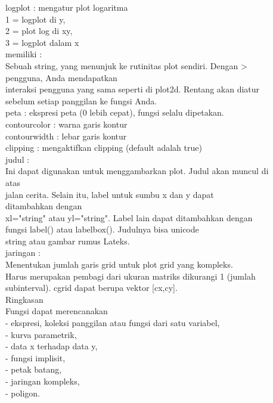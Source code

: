 \documentclass[a4paper,10pt]{article}
\begin{document}
\begin{eulernotebook}
\begin{eulercomment}
\begin{eulercomment}
\begin{eulercomment}
\begin{eulercomment}
\begin{eulercomment}
\begin{eulercomment}
\begin{eulercomment}
\begin{eulercomment}
\begin{eulercomment}
\begin{eulercomment}
\begin{eulercomment}
logplot : mengatur plot logaritma\\
1 = logplot di y,\\
2 = plot log di xy,\\
3 = logplot dalam x\\
memiliki :\\
Sebuah string, yang menunjuk ke rutinitas plot sendiri. Dengan \textgreater{}\\
pengguna, Anda mendapatkan\\
interaksi pengguna yang sama seperti di plot2d. Rentang akan diatur\\
sebelum setiap panggilan ke fungsi Anda.\\
peta : ekspresi peta (0 lebih cepat), fungsi selalu dipetakan.\\
contourcolor : warna garis kontur\\
contourwidth : lebar garis kontur\\
clipping : mengaktifkan clipping (default adalah true)\\
judul :\\
Ini dapat digunakan untuk menggambarkan plot. Judul akan muncul di\\
atas\\
jalan cerita. Selain itu, label untuk sumbu x dan y dapat\\
ditambahkan dengan\\
xl="string" atau yl="string". Label lain dapat ditambahkan dengan\\
fungsi label() atau labelbox(). Judulnya bisa unicode\\
string atau gambar rumus Lateks.\\
jaringan :\\
Menentukan jumlah garis grid untuk plot grid yang kompleks.\\
Harus merupakan pembagi dari ukuran matriks dikurangi 1 (jumlah\\
subinterval). cgrid dapat berupa vektor [cx,cy].\\
Ringkasan\\
Fungsi dapat merencanakan\\
- ekspresi, koleksi panggilan atau fungsi dari satu variabel,\\
- kurva parametrik,\\
- data x terhadap data y,\\
- fungsi implisit,\\
- petak batang,\\
- jaringan kompleks,\\
- poligon.\\

\end{eulercomment}
\end{eulercomment}
\end{eulercomment}
\end{eulercomment}
\end{eulercomment}
\end{eulercomment}
\end{eulercomment}
\end{eulercomment}
\end{eulercomment}
\end{eulercomment}
\end{eulercomment}
\end{eulernotebook}
\end{document}
